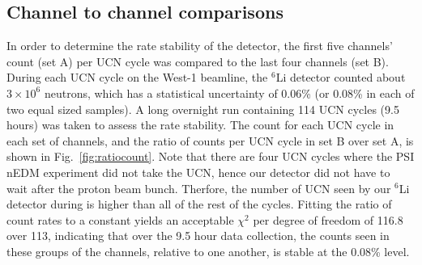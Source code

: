 \documentclass[twocolumn]{bmcart}
\begin{document}
\subsection{ Channel to channel comparisons }

In order to determine the rate stability of the detector, the first
five channels' count (set A) per UCN cycle was compared to the last
four channels (set B).  During each UCN cycle on the West-1 beamline,
the $^6$Li detector counted about $3\times10^6$ neutrons, which has a
statistical uncertainty of 0.06\% (or 0.08\% in each of two equal
sized samples).  A long overnight run containing 114 UCN cycles (9.5
hours) was taken to assess the rate stability.  The count for each UCN
cycle in each set of channels, and the ratio of counts per UCN cycle
in set B over set A, is shown in Fig.~\ref{fig:ratiocount}.  Note that
there are four UCN cycles where the PSI nEDM experiment did not take
the UCN, hence our detector did not have to wait after the proton beam
bunch. Therfore, the number of UCN seen by our $^6$Li detector during
is higher than all of the rest of the cycles.  Fitting the ratio of
count rates to a constant yields an acceptable $\chi^2$ per degree of
freedom of 116.8 over 113, indicating that over the 9.5 hour data
collection, the counts seen in these groups of the channels, relative
to one another, is stable at the 0.08\% level.
\end{document}
